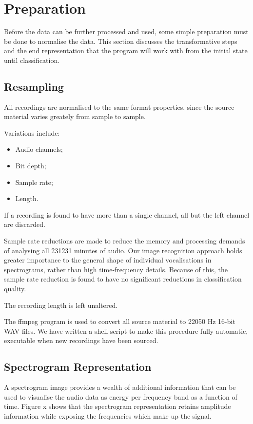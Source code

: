 \section{Preparation}\label{sec:prep}
Before the data can be further processed and used, some simple preparation
must be done to normalise the data.
This section discusses the transformative steps and the end representation that
the program will work with from the initial state until classification.

\subsection{Resampling}
All recordings are normalised to the same format properties, since the source
material varies greately from sample to sample.

Variations include:
\begin{itemize}[noitemsep]
  \item Audio channels;
  \item Bit depth;
  \item Sample rate;
  \item Length.
\end{itemize}

If a recording is found to have more than a single channel, all but the left
channel are discarded.

Sample rate reductions are made to reduce the memory and processing demands of
analysing all 231231 minutes of audio.
Our image recognition approach holds greater importance to the general shape
of individual vocalisations in spectrograms, rather than high time-frequency
details.
Because of this, the sample rate reduction is found to have no significant
reductions in classification quality.

The recording length is left unaltered.

The ffmpeg program is used to convert all source material to 22050 Hz 16-bit
WAV files.
We have written a shell script to make this procedure fully automatic, executable
when new recordings have been sourced.



\subsection{Spectrogram Representation}
A spectrogram image provides a wealth of additional information that can be used
to visualise the audio data as energy per frequency band as a function of time.
Figure x shows that the spectrogram representation retains amplitude information
while exposing the frequencies which make up the signal.

